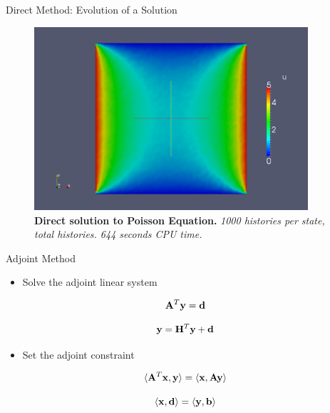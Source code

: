 \documentclass{beamer}
\begin{document}
\begin{frame}{Direct Method: Evolution of a Solution}

  \begin{figure}[h!]
    \begin{center}
      \includegraphics[width=4in]{direct_1000.png}
    \end{center}
    \caption{\textbf{Direct solution to Poisson Equation.} \textit{1000
        histories per state,  total histories. 644 seconds
        CPU time.} }
  \end{figure}

\end{frame}

\begin{frame}{Adjoint Method}

  \begin{itemize}
  \item Solve the adjoint linear system
  \end{itemize}

  \[
  \mathbf{A}^T \mathbf{y} = \mathbf{d}
  \]

  \[
  \mathbf{y} = \mathbf{H}^T \mathbf{y} + \mathbf{d}
  \]

  \begin{itemize}
  \item Set the adjoint constraint
  \end{itemize}

  \[
  \langle \mathbf{A}^T \mathbf{x}, \mathbf{y} \rangle = \langle \mathbf{x}, \mathbf{A}
  \mathbf{y} \rangle
  \]

  \[
  \langle \mathbf{x}, \mathbf{d} \rangle = \langle \mathbf{y}, \mathbf{b} \rangle
  \]
  
\end{frame}
\end{document}
